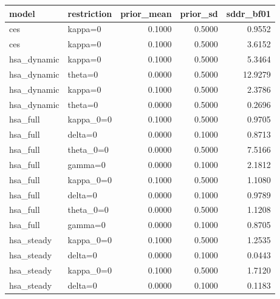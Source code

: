 \begin{tabular}{llrrr}
\toprule
model & restriction & prior\_mean & prior\_sd & sddr\_bf01 \\
\midrule
ces & kappa=0 & 0.1000 & 0.5000 & 0.9552 \\
ces & kappa=0 & 0.1000 & 0.5000 & 3.6152 \\
hsa\_dynamic & kappa=0 & 0.1000 & 0.5000 & 5.3464 \\
hsa\_dynamic & theta=0 & 0.0000 & 0.5000 & 12.9279 \\
hsa\_dynamic & kappa=0 & 0.1000 & 0.5000 & 2.3786 \\
hsa\_dynamic & theta=0 & 0.0000 & 0.5000 & 0.2696 \\
hsa\_full & kappa\_0=0 & 0.1000 & 0.5000 & 0.9705 \\
hsa\_full & delta=0 & 0.0000 & 0.1000 & 0.8713 \\
hsa\_full & theta\_0=0 & 0.0000 & 0.5000 & 7.5166 \\
hsa\_full & gamma=0 & 0.0000 & 0.1000 & 2.1812 \\
hsa\_full & kappa\_0=0 & 0.1000 & 0.5000 & 1.1080 \\
hsa\_full & delta=0 & 0.0000 & 0.1000 & 0.9789 \\
hsa\_full & theta\_0=0 & 0.0000 & 0.5000 & 1.1208 \\
hsa\_full & gamma=0 & 0.0000 & 0.1000 & 0.8705 \\
hsa\_steady & kappa\_0=0 & 0.1000 & 0.5000 & 1.2535 \\
hsa\_steady & delta=0 & 0.0000 & 0.1000 & 0.0443 \\
hsa\_steady & kappa\_0=0 & 0.1000 & 0.5000 & 1.7120 \\
hsa\_steady & delta=0 & 0.0000 & 0.1000 & 0.1183 \\
\bottomrule
\end{tabular}
